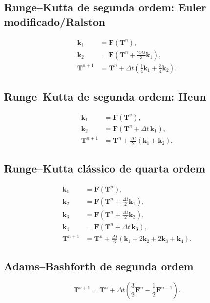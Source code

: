 \documentclass[12pt,a4paper]{article}
\begin{document}
\subsection{Runge--Kutta de segunda ordem: Euler modificado/Ralston}
\begin{align}
    \mathbf{k}_1 &= \mathbf{F}(\mathbf{T}^{n}),\\
    \mathbf{k}_2 &= \mathbf{F}\left(\mathbf{T}^{n}
        +\frac{2\Delta t}{3}\mathbf{k}_1\right),\\
    \mathbf{T}^{n+1}
    &=
    \mathbf{T}^{n}
    +
    \Delta t\left(\frac{1}{4}\mathbf{k}_1+\frac{3}{4}\mathbf{k}_2\right).
\end{align}

\subsection{Runge--Kutta de segunda ordem: Heun}
\begin{align}
    \mathbf{k}_1 &= \mathbf{F}(\mathbf{T}^{n}),\\
    \mathbf{k}_2 &= \mathbf{F}\left(\mathbf{T}^{n}+\Delta t\,\mathbf{k}_1\right),\\
    \mathbf{T}^{n+1}
    &=
    \mathbf{T}^{n}
    +
    \frac{\Delta t}{2}\left(\mathbf{k}_1+\mathbf{k}_2\right).
\end{align}

\subsection{Runge--Kutta clássico de quarta ordem}
\begin{align}
    \mathbf{k}_1 &= \mathbf{F}(\mathbf{T}^{n}),\\
    \mathbf{k}_2 &= \mathbf{F}\left(\mathbf{T}^{n}
        +\frac{\Delta t}{2}\mathbf{k}_1\right),\\
    \mathbf{k}_3 &= \mathbf{F}\left(\mathbf{T}^{n}
        +\frac{\Delta t}{2}\mathbf{k}_2\right),\\
    \mathbf{k}_4 &= \mathbf{F}\left(\mathbf{T}^{n}
        +\Delta t\,\mathbf{k}_3\right),\\
    \mathbf{T}^{n+1}
    &=
    \mathbf{T}^{n}
    +
    \frac{\Delta t}{6}
    \left(\mathbf{k}_1+2\mathbf{k}_2+2\mathbf{k}_3+\mathbf{k}_4\right).
\end{align}

\subsection{Adams--Bashforth de segunda ordem}
\begin{equation}
    \mathbf{T}^{n+1}
    =
    \mathbf{T}^{n}
    +
    \Delta t
    \left(
        \frac{3}{2}\mathbf{F}^{n}
        -
        \frac{1}{2}\mathbf{F}^{n-1}
    \right).
\end{equation}
\end{document}
